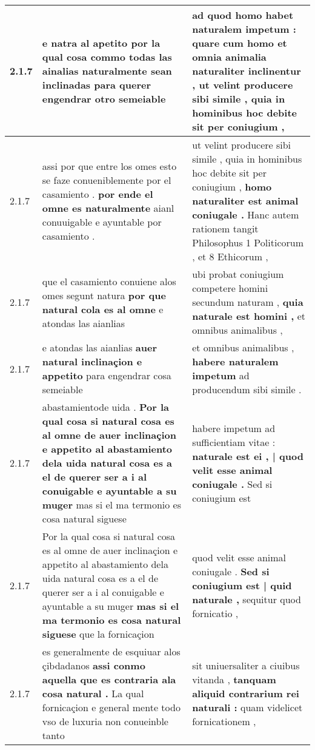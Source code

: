 \begin{tabular}{|p{1cm}|p{6.5cm}|p{6.5cm}|}
2.1.7 & e natra al apetito \textbf{ por la qual cosa commo todas las ainalias naturalmente sean inclinadas } para querer engendrar otro semeiable & ad quod homo habet naturalem impetum : \textbf{ quare cum homo et omnia animalia naturaliter inclinentur , } ut velint producere sibi simile , quia in hominibus hoc debite sit per coniugium , \\\hline
2.1.7 & assi por que entre los omes esto se faze conueniblemente por el casamiento . \textbf{ por ende el omne es naturalmente } aianl conuuigable e ayuntable por casamiento . & ut velint producere sibi simile , quia in hominibus hoc debite sit per coniugium , \textbf{ homo naturaliter est animal coniugale . } Hanc autem rationem tangit Philosophus 1 Politicorum , et 8 Ethicorum , \\\hline
2.1.7 & que el casamiento conuiene alos omes segunt natura \textbf{ por que natural cola es al omne } e atondas las aianlias & ubi probat coniugium competere homini secundum naturam , \textbf{ quia naturale est homini , } et omnibus animalibus , \\\hline
2.1.7 & e atondas las aianlias \textbf{ auer natural inclinaçion e appetito } para engendrar cosa semeiable & et omnibus animalibus , \textbf{ habere naturalem impetum } ad producendum sibi simile . \\\hline
2.1.7 & abastamientode uida . \textbf{ Por la qual cosa si natural cosa es al omne de auer inclinaçion e appetito al abastamiento dela uida natural cosa es a el de querer ser a i al conuigable e ayuntable a su muger } mas si el ma termonio es cosa natural siguese & habere impetum ad sufficientiam vitae : \textbf{ naturale est ei , | quod velit esse animal coniugale . } Sed si coniugium est \\\hline
2.1.7 & Por la qual cosa si natural cosa es al omne de auer inclinaçion e appetito al abastamiento dela uida natural cosa es a el de querer ser a i al conuigable e ayuntable a su muger \textbf{ mas si el ma termonio es cosa natural siguese } que la fornicaçion & quod velit esse animal coniugale . \textbf{ Sed si coniugium est | quid naturale , } sequitur quod fornicatio , \\\hline
2.1.7 & es generalmente de esquiuar alos çibdadanos \textbf{ assi conmo aquella que es contraria ala cosa natural . } La qual fornicaçion e general mente todo vso de luxuria non conueinble tanto & sit uniuersaliter a ciuibus vitanda , \textbf{ tanquam aliquid contrarium rei naturali : } quam videlicet fornicationem , \\\hline

\end{tabular}
